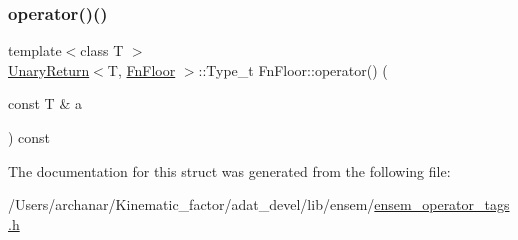 \mbox{\label{structFnFloor_ab74b902d8ab286ae5ec2c6066140919b}} 
\subsubsection{\texorpdfstring{operator()()}{operator()()}\hspace{0.1cm}{\footnotesize\ttfamily [2/2]}}
{\footnotesize\ttfamily template$<$class T $>$ \\
\mbox{\hyperlink{structUnaryReturn}{Unary\+Return}}$<$T, \mbox{\hyperlink{structFnFloor}{Fn\+Floor}} $>$\+::Type\+\_\+t Fn\+Floor\+::operator() (\begin{DoxyParamCaption}\item[{const T \&}]{a }\end{DoxyParamCaption}) const\hspace{0.3cm}{\ttfamily [inline]}}



The documentation for this struct was generated from the following file\+:\begin{DoxyCompactItemize}
\item 
/\+Users/archanar/\+Kinematic\+\_\+factor/adat\+\_\+devel/lib/ensem/\mbox{\hyperlink{lib_2ensem_2ensem__operator__tags_8h}{ensem\+\_\+operator\+\_\+tags.\+h}}\end{DoxyCompactItemize}
